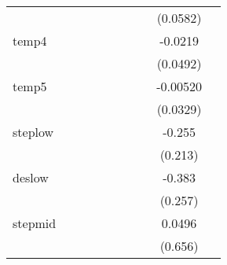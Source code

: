 {\begin{tabular}{l*{9}{c}}
            &                     &                     &                     &                     &                     &                     &                     &    (0.0582)         &                     \\
[1em]
temp4       &                     &                     &                     &                     &                     &                     &                     &     -0.0219         &                     \\
            &                     &                     &                     &                     &                     &                     &                     &    (0.0492)         &                     \\
[1em]
temp5       &                     &                     &                     &                     &                     &                     &                     &    -0.00520         &                     \\
            &                     &                     &                     &                     &                     &                     &                     &    (0.0329)         &                     \\
[1em]
steplow     &                     &                     &                     &                     &                     &                     &                     &      -0.255         &                     \\
            &                     &                     &                     &                     &                     &                     &                     &     (0.213)         &                     \\
[1em]
deslow      &                     &                     &                     &                     &                     &                     &                     &      -0.383         &                     \\
            &                     &                     &                     &                     &                     &                     &                     &     (0.257)         &                     \\
[1em]
stepmid     &                     &                     &                     &                     &                     &                     &                     &      0.0496         &                     \\
            &                     &                     &                     &                     &                     &                     &                     &     (0.656)         &                     \\

\end{tabular}}
